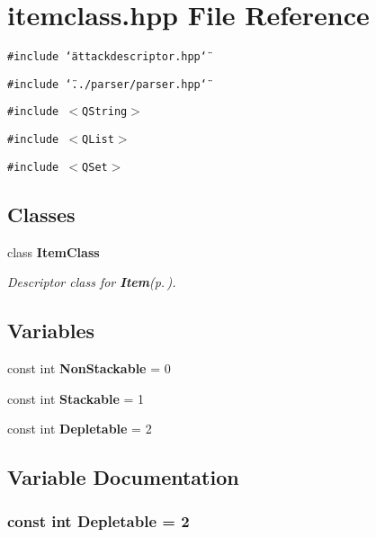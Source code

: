 \section{itemclass.hpp File Reference}
\label{itemclass_8hpp}
{\tt \#include \char`\"{}attackdescriptor.hpp\char`\"{}}\par
{\tt \#include \char`\"{}../parser/parser.hpp\char`\"{}}\par
{\tt \#include $<$QString$>$}\par
{\tt \#include $<$QList$>$}\par
{\tt \#include $<$QSet$>$}\par
\subsection*{Classes}
\begin{CompactItemize}
\item 
class {\bf Item\-Class}
\begin{CompactList}\small\item\em Descriptor class for {\bf Item}{\rm (p.\,\pageref{classItem})}. \item\end{CompactList}\end{CompactItemize}
\subsection*{Variables}
\begin{CompactItemize}
\item 
const int {\bf Non\-Stackable} = 0
\item 
const int {\bf Stackable} = 1
\item 
const int {\bf Depletable} = 2
\end{CompactItemize}


\subsection{Variable Documentation}
\subsubsection{\setlength{\rightskip}{0pt plus 5cm}const int {\bf Depletable} = 2}\label{itemclass_8hpp_a2}


